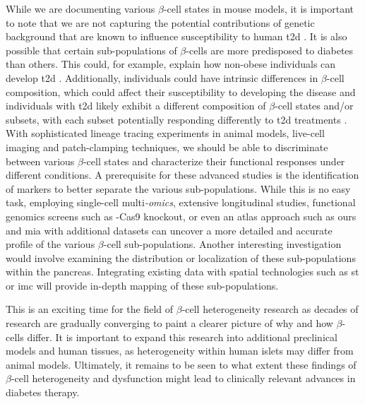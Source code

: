 \par While we are documenting various $\beta$-cell states in mouse models, it is important to note that we are not capturing the potential contributions of genetic background that are known to influence susceptibility to human \gls{t2d} \textbf{\cite{cauchi_genetic_2008,grarup_genetic_2014,karaderi_insights_2015,prasad_genetics_2015,wang_genetic_2016}}. It is also possible that certain sub-populations of $\beta$-cells are more predisposed to diabetes than others. This could, for example, explain how non-obese individuals can develop \gls{t2d} \textbf{\cite{vaag_non-obese_2007,olaogun_pathophysiology_2020}}. Additionally, individuals could have intrinsic differences in $\beta$-cell composition, which could affect their susceptibility to developing the disease and individuals with \gls{t2d} likely exhibit a different composition of $\beta$-cell states and/or subsets, with each subset potentially responding differently to \gls{t2d} treatments \textbf{\cite{wang_integrating_2023}}. With sophisticated lineage tracing experiments in animal models, live-cell imaging and patch-clamping techniques, we should be able to discriminate between various $\beta$-cell states and characterize their functional responses under different conditions. A prerequisite for these advanced studies is the identification of markers to better separate the various sub-populations. While this is no easy task, employing single-cell multi\textit{-omics}, extensive longitudinal studies, functional genomics screens such as -Cas9 knockout, or even an atlas approach such as ours and \gls{mia} with additional datasets can uncover a more detailed and accurate profile of the various $\beta$-cell sub-populations. Another interesting investigation would involve examining the distribution or localization of these sub-populations within the pancreas. Integrating existing data with spatial technologies such as \gls{st} \textbf{\cite{tian_expanding_2023, olaniru_single-cell_2023}} or \gls{imc} will provide in-depth mapping of these sub-populations.\\

\par This is an exciting time for the field of $\beta$-cell heterogeneity research as decades of research are gradually converging to paint a clearer picture of why and how $\beta$-cells differ. It is important to expand this research into additional preclinical models and human tissues, as heterogeneity within human islets may differ from animal models. Ultimately, it remains to be seen to what extent these findings of $\beta$-cell heterogeneity and dysfunction might lead to clinically relevant advances in diabetes therapy.


